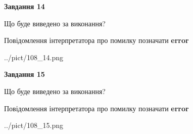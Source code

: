 \documentclass[11pt, ukrainian]{article}
\begin{document}
{\begin {large}
{\begin {center}\textbf{Завдання 14}\end {center}}\par
Що буде виведено за виконання? \par
Повідомлення інтерпретатора про помилку позначати \textbf{error}

\begin{center}
	{../pict/108_14.png}
\end{center}
\newpage

{\begin {center}\textbf{Завдання 15}\end {center}}\par
Що буде виведено за виконання? \par
Повідомлення інтерпретатора про помилку позначати \textbf{error}

\begin{center}
	{../pict/108_15.png}
\end{center}
\newpage

\end {large}}
\end{document}
